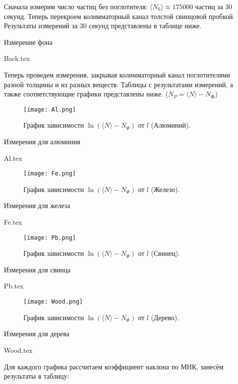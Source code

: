 Сначала измерим число частиц без поглотителя: $\langle N_0 \rangle \approx
175000$ частиц за $30$ секунд. Теперь перекроем колимматорный канал толстой
свинцовой пробкой. Результаты измерений за 30 секунд представлены в таблице
ниже.

\begin{table}[h!]
  \centering
  \caption{Измерение фона}
  {Back.tex}
\end{table}

Теперь проведем измерения, закрывая колимматорный канал поглотителями разной
толщины и из разных веществ. Таблицы с результатами измерений, а также
соответствующие графики представлены ниже.
($N_P = \langle N \rangle -N_{\text{Ф}}$)
\newpage
\begin{figure}[h!]
  \texttt{[image: Al.png]}
  \caption{График зависимости 
  $\ln{(\langle N \rangle-N_{\Phi})}$ от $l$ (Алюминий).
  }
\end{figure}

\begin{table}[h!]
  \centering
  \caption{Измерения для алюминия}
  {Al.tex}
\end{table}

\newpage
\begin{figure}[h!]
  \texttt{[image: Fe.png]}
  \caption{График зависимости 
  $\ln{(\langle N \rangle-N_{\Phi})}$ от $l$ (Железо).
  }
\end{figure}

\begin{table}[h!]
  \centering
  \caption{Измерения для железа}
  {Fe.tex}
\end{table}

\newpage
\begin{figure}[h!]
  \texttt{[image: Pb.png]}
  \caption{График зависимости 
  $\ln{(\langle N \rangle-N_{\Phi})}$ от $l$ (Свинец).
  }
\end{figure}

\begin{table}[h!]
  \centering
  \caption{Измерения для свинца}
  {Pb.tex}
\end{table}

\newpage
\begin{figure}[h!]
  \texttt{[image: Wood.png]}
  \caption{График зависимости 
  $\ln{(\langle N \rangle-N_{\Phi})}$ от $l$ (Дерево).
  }
\end{figure}

\begin{table}[h!]
  \centering
  \caption{Измерения для дерева}
  {Wood.tex}
\end{table}


Для каждого графика рассчитаем коэффициент наклона по МНК, 
занесём результаты в таблицу:
